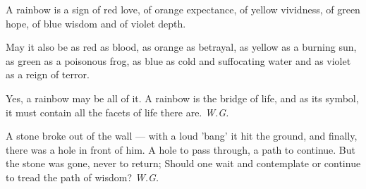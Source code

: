 A rainbow 
is a sign of red love, 
of orange expectance, 
of yellow vividness, 
of green hope, 
of blue wisdom 
and of violet depth. 

May it also be 
as red as blood, 
as orange as betrayal, 
as yellow as a burning sun, 
as green as a poisonous frog, 
as blue as cold and suffocating water 
and as violet as a reign of terror. 

Yes, a rainbow may be all of it. 
A rainbow is the bridge of life, 
and as its symbol, it must contain 
all the facets of life 
there are. 
\emph{W.G.}

A stone broke out of the wall --- 
with a loud 'bang' it hit the ground, 
and finally, there was a hole 
in front of him. 
A hole to pass through, 
a path to continue. 
But the stone was gone, 
never to return; 
Should one wait and contemplate 
or continue to tread the path of wisdom? 
\emph{W.G.}

